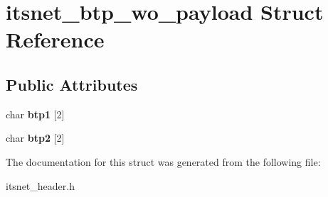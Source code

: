 \hypertarget{structitsnet__btp__wo__payload}{\section{itsnet\-\_\-btp\-\_\-wo\-\_\-payload \-Struct \-Reference}
\label{structitsnet__btp__wo__payload}
}
\subsection*{\-Public \-Attributes}
\begin{DoxyCompactItemize}
\item 
\hypertarget{structitsnet__btp__wo__payload_a46633965cf98e7daf18d7b57858037f0}{char {\bfseries btp1} \mbox{[}2\mbox{]}}\label{structitsnet__btp__wo__payload_a46633965cf98e7daf18d7b57858037f0}

\item 
\hypertarget{structitsnet__btp__wo__payload_a38f56ffd905e38583e4f6eea508d6dd1}{char {\bfseries btp2} \mbox{[}2\mbox{]}}\label{structitsnet__btp__wo__payload_a38f56ffd905e38583e4f6eea508d6dd1}

\end{DoxyCompactItemize}


\-The documentation for this struct was generated from the following file\-:\begin{DoxyCompactItemize}
\item 
itsnet\-\_\-header.\-h\end{DoxyCompactItemize}
